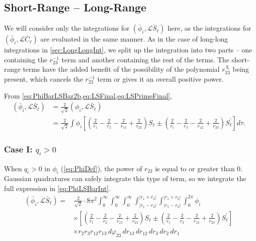 \documentclass[Dissertation.tex]{subfiles}
\begin{document}
\subsection{Short-Range -- Long-Range}
\label{sec:ShortLongInt}
We will consider only the integrations for $(\bar{\phi}_i,\mathcal{L} \bar{S}_\ell)$ 
here, as the integrations for $(\bar{\phi}_i,\mathcal{L} \bar{C}_\ell)$
are evaluated in the same manner. As in the case of long-long 
integrations in \cref{sec:LongLongInt}, we split up the integration 
into two parts -- one containing the $r_{23}^{-1}$ term and another 
containing the rest of the terms. The short-range terms have the added 
benefit of the possibility of the polynomial $r_{23}^{\,q_i}$ being present, 
which cancels the $r_{23}^{-1}$ term or gives it an overall positive power.


From \cref{eq:PhiBarLSBar2b,eq:LSFinal,eq:LSPrimeFinal},
\begin{align}
\label{eq:PhiLSBarInt}
\nonumber (\bar{\phi}_i, \mathcal{L} \bar{S}_\ell) &= \frac{2}{\sqrt{2}} \left(\phi_i,\mathcal{L} \bar{S}_\ell\right) \\
 &= \frac{2}{\sqrt{2}} \int \phi_i \left[ \left( \frac{2}{r_1} - \frac{2}{r_2} - \frac{2}{r_{13}} + \frac{2}{r_{23}} \right)S_\ell \pm \left( \frac{2}{r_1} - \frac{2}{r_3} - \frac{2}{r_{12}} + \frac{2}{r_{23}} \right) S_\ell^\prime \right]  d\tau.
\end{align}

\subsubsection{Case I: \texorpdfstring{$q_i > 0$}{qi > 0}}
\label{sec:Swaveqigt0}
When $q_i > 0$ in $\phi_i$ (\cref{eq:PhiDef}), the power of $r_{23}$ is
equal to or greater than 0. Gaussian quadratures can safely integrate this type
of term, so we integrate the full expression in \cref{eq:PhiLSBarInt}.
\begin{align}
\label{eq:PhiLSBarIntFull}
\nonumber (\bar{\phi}_i, \mathcal{L} \bar{S}_\ell) =& \, \frac{2}{\sqrt{2}} \cdot 8\pi^2  \int_0^\infty \int_0^\infty \int_0^\infty \int_{|r_1 - r_2|}^{|r_1 + r_2|} \int_{|r_1 - r_3|}^{|r_1 + r_3|} \int_0^{2\pi} \phi_i \\
&\times \left[ \left( \frac{2}{r_1} - \frac{2}{r_2} - \frac{2}{r_{13}} + \frac{2}{r_{23}} \right)S_\ell \pm \left( \frac{2}{r_1} - \frac{2}{r_3} - \frac{2}{r_{12}} + \frac{2}{r_{23}} \right) S_\ell^\prime \right] \\
&\times r_2 r_3 r_{12} r_{13}\, d\varphi_{23}\, dr_{13}\, dr_{12}\, dr_3\, dr_2\, dr_1
\end{align}
\end{document}
